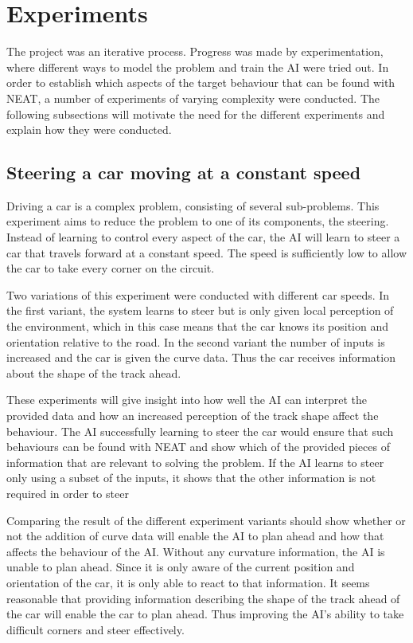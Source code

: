 \section{Experiments}

The project was an iterative process. Progress was made by experimentation, where different ways to model the problem and train the AI were tried out. In order to establish which aspects of the target behaviour that can be found with NEAT, a number of experiments of varying complexity were conducted. The following subsections will motivate the need for the different experiments and explain how they were conducted. 

\subsection{Steering a car moving at a constant speed}

Driving a car is a complex problem, consisting of several sub-problems. This experiment aims to reduce the problem to one of its components, the steering. Instead of learning to control every aspect of the car, the AI will learn to steer a car that travels forward at a constant speed. The speed is sufficiently low to allow the car to take every corner on the circuit. 

Two variations of this experiment were conducted with different car speeds. In the first variant, the system learns to steer but is only given local perception of the environment, which in this case means that the car knows its position and orientation relative to the road. In the second variant the number of inputs is increased and the car is given the curve data. Thus the car receives information about the shape of the track ahead.

These experiments will give insight into how well the AI can interpret the provided data and how an increased perception of the track shape affect the behaviour. The AI successfully learning to steer the car would ensure that such behaviours can be found with NEAT and show which of the provided pieces of information that are relevant to solving the problem. If the AI learns to steer only using a subset of the inputs, it shows that the other information is not required in order to steer

Comparing the result of the different experiment variants should show whether or not the addition of curve data will enable the AI to plan ahead and how that affects the behaviour of the AI. Without any curvature information, the AI is unable to plan ahead. Since it is only aware of the current position and orientation of the car, it is only able to react to that information. It seems reasonable that providing information describing the shape of the track ahead of the car will enable the car to plan ahead. Thus improving the AI's ability to take difficult corners and steer effectively. 

